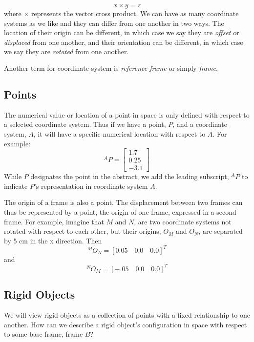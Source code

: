 \[
x \times y = z
\]
where $\times$ represents the vector cross product.
We can have as many coordinate systems as we like and they can differ from one another in two ways.  The location of their origin can be different, in which case we say they are {\it offset} or {\it displaced} from one another, and their orientation can be different, in which case we say they are {\it rotated} from one another.

 Another term for coordinate system is {\it reference frame} or simply {\it frame}.

\subsection{Points}
The numerical value or location of a point in space is only defined  with respect to a selected coordinate system.   Thus if we have a point, $P$, and a coordinate system, $A$, it will have a specific numerical location with respect to $A$. For example:
\[
^AP = \left [
\begin{array}{c}   1.7 \\ 0.25 \\ -3.1 \end{array}
\right ]
\]
While $P$ designates the point in the abstract, we add the leading subscript, $^AP$ to indicate $P$'s representation in coordinate system $A$.

The origin of a frame is also a point.   The displacement between two frames can thus be represented by a point, the origin of one frame, expressed in a second frame.   For example, imagine that  $M$ and $N$, are two coordinate systems not rotated with respect to each other, but their origins, $O_M$ and $O_N$, are separated by 5 cm in the x direction. Then
\[
^MO_N = [0.05  \quad 0.0 \quad 0.0]^T
\]
and
\[
^NO_M = [-.05 \quad 0.0 \quad 0.0]^T
\]




\subsection{Rigid Objects}
We will view rigid objects as a collection of points with a fixed relationship to one another.   How can we describe a rigid object's configuration in space with respect to some base frame, frame $B$?

